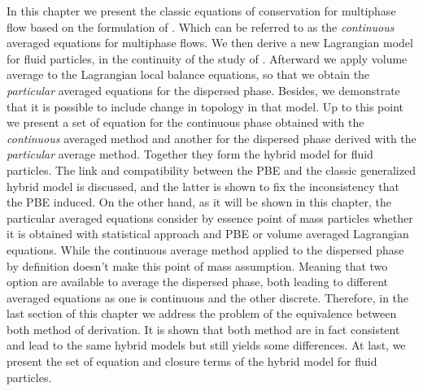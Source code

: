 In this chapter we present the classic equations of conservation for multiphase flow based on the formulation of \citet{drew1983mathematical,kataoka1986local,ishii2010thermo}. 
Which can be referred to as the \textit{continuous} averaged equations for multiphase flows. 
We then derive a new Lagrangian model for fluid particles, in the continuity of the study of \citet{morel2015mathematical,zaepffel2011modelisation}.
Afterward we apply volume average to the Lagrangian local balance equations, so that we obtain the \textit{particular} averaged equations for the dispersed phase.  
Besides, we demonstrate that it is possible to include change in topology in that model. 
Up to this point we present a set of equation for the continuous phase obtained with the \textit{continuous} averaged method and another for the dispersed phase derived with the \textit{particular} average method. 
Together they form the hybrid model for fluid particles. 
The link and compatibility between the PBE and the classic  generalized hybrid model is discussed, and the latter is shown to fix the inconsistency that the PBE induced. 
On the other hand, as it will be shown in this chapter, the particular averaged equations consider by essence point of mass particles whether it is obtained with statistical approach and PBE or volume averaged Lagrangian equations.
While the continuous average method applied to the dispersed phase by definition doesn't make this point of mass assumption.  
Meaning that two option are available to average the dispersed phase, both leading to different averaged equations as one is continuous and the other discrete. 
Therefore, in the last section of this chapter we address the problem of the equivalence between both method of derivation. 
It is shown that both method are in fact consistent and lead to the same hybrid models but still yields some differences. 
At last, we present the set of equation  and closure terms of the hybrid model for fluid particles.  


